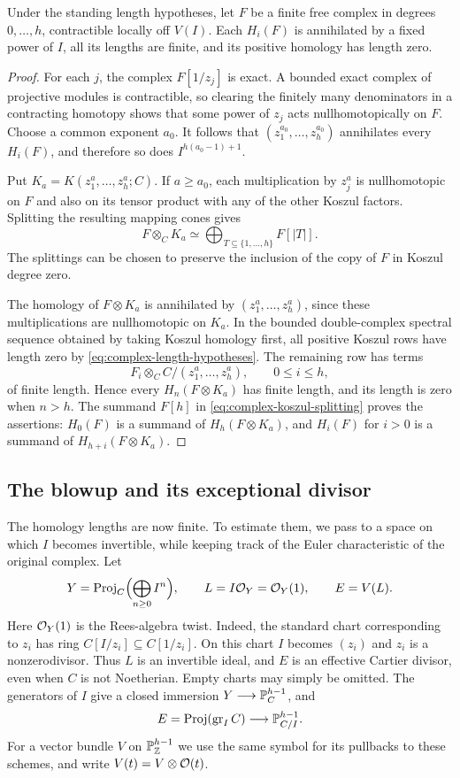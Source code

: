 \begin{lemma}\label{lem:acyclicity}
Under the standing length hypotheses, let $F$ be a finite free
complex in degrees $0,\ldots,h$, contractible locally off $V(I)$.
Each $H_i(F)$ is annihilated by
a fixed power of $I$, all its lengths are finite, and its positive
homology has length zero.
\end{lemma}
\begin{proof}
For each $j$, the complex $F[1/z_j]$ is exact. A bounded exact complex of
projective modules is contractible, so clearing the finitely many
denominators in a contracting homotopy shows that some power of $z_j$
acts nullhomotopically on $F$. Choose a common exponent $a_0$.
It follows that $(z_1^{a_0},\ldots,z_h^{a_0})$ annihilates every $H_i(F)$,
and therefore so does $I^{h(a_0-1)+1}$.

Put $K_a=K(z_1^a,\ldots,z_h^a;C)$. If $a\geq a_0$, each multiplication
by $z_j^a$ is nullhomotopic on $F$ and also on its tensor product with any
of the other Koszul factors. Splitting the resulting mapping cones gives
\begin{equation}\label{eq:complex-koszul-splitting}
 F\otimes_C K_a\simeq
 \bigoplus_{T\subseteq\{1,\ldots,h\}}F[|T|].
\end{equation}
The splittings can be chosen to preserve the inclusion of the copy of
$F$ in Koszul degree zero.

The homology of $F\otimes K_a$ is annihilated by
$(z_1^a,\ldots,z_h^a)$, since these multiplications are nullhomotopic on
$K_a$. In the bounded double-complex spectral sequence obtained by taking
Koszul homology first, all positive Koszul rows have length zero by
\eqref{eq:complex-length-hypotheses}. The remaining row has terms
\[
 F_i\otimes_C C/(z_1^a,\ldots,z_h^a),\qquad 0\leq i\leq h,
\]
of finite length. Hence every $H_n(F\otimes K_a)$ has finite length, and
its length is zero when $n>h$. The summand $F[h]$ in
\eqref{eq:complex-koszul-splitting} proves the assertions: $H_0(F)$ is a
summand of $H_h(F\otimes K_a)$, and $H_i(F)$ for $i>0$ is a summand of
$H_{h+i}(F\otimes K_a)$.
\end{proof}

\subsection{The blowup and its exceptional divisor}

The homology lengths are now finite. To estimate them, we pass to a
space on which $I$ becomes invertible, while keeping track of the
Euler characteristic of the original complex. Let
\[
 Y=\operatorname{Proj}_C\Bigl(\bigoplus_{n\geq0}I^n\Bigr),\qquad
 L=I\mathcal O_Y=\mathcal O_Y(1),\qquad E=V(L).
\]
Here $\mathcal O_Y(1)$ is the Rees-algebra twist. Indeed, the standard chart
corresponding to $z_i$ has ring $C[I/z_i]\subseteq C[1/z_i]$. On this
chart $I$ becomes $(z_i)$ and $z_i$ is a nonzerodivisor. Thus $L$ is an
invertible ideal, and $E$ is an effective Cartier divisor, even when $C$
is not Noetherian. Empty charts may simply be omitted. The generators of
$I$ give a closed immersion $Y\longrightarrow\mathbb P_C^{h-1}$, and
\[
 E=\operatorname{Proj}(\operatorname{gr}_I C)\longrightarrow\mathbb P_{C/I}^{h-1}.
\]
For a vector bundle $V$ on $\mathbb P_\mathbb Z^{h-1}$ we use the same symbol for its
pullbacks to these schemes, and write $V(t)=V\otimes\mathcal O(t)$.

